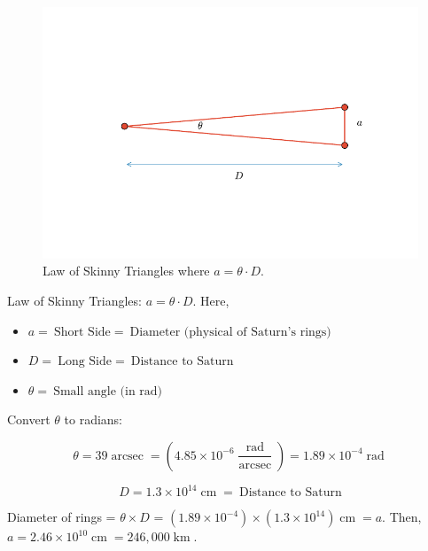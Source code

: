\documentclass[11pt]{scrartcl}
\DeclareMathOperator{\arcsec}{arcsec}
\DeclareMathOperator{\km}{km}
\DeclareMathOperator{\cm}{cm}
\DeclareMathOperator{\rad}{rad}
\newcommand\pow[2]{\ensuremath{#1 \times 10^{#2}}}
\begin{document}
\begin{figure}[H]
\centering
\includegraphics[width=\textwidth]{figures/problem-set-1-skinny-triangle.pdf}
\caption{Law of Skinny Triangles where $a = \theta \cdot D$.}
\end{figure}

Law of Skinny Triangles: $a = \theta \cdot D$. Here,

\begin{itemize}
\item $a =\ \text{Short Side} = \ \text{Diameter (physical of Saturn's rings)}$
\item $D = \ \text{Long Side} = \ \text{Distance to Saturn}$
\item $\theta = \ \text{Small angle (in rad)}$
\end{itemize}

Convert $\theta$ to radians:

\[\theta = 39\arcsec = \left(\pow{4.85}{-6}\frac{\rad}{\arcsec}\right) = \pow{1.89}{-4}\rad\]

\[D = \pow{1.3}{14}\cm = \ \text{Distance to Saturn}\]

Diameter of rings = $\theta \times D$ = $\left(\pow{1.89}{-4}\right) \times \left(\pow{1.3}{14}\right) \cm = a$. Then, $a = \pow{2.46}{10}\cm = 246,000\km$.
\end{document}
